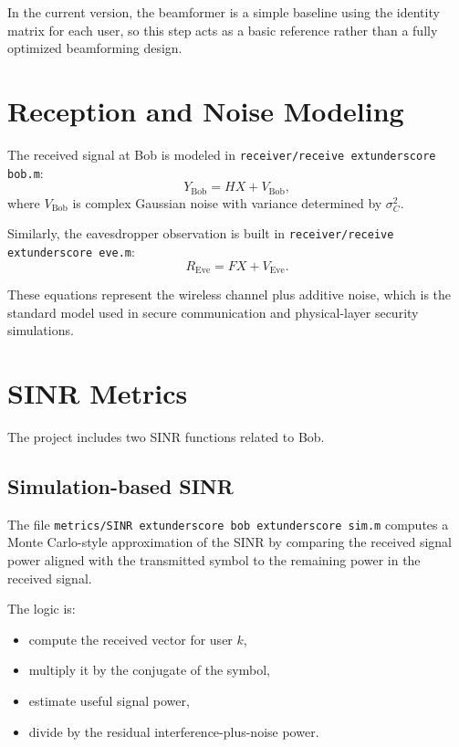 \documentclass[12pt]{article}
\begin{document}
In the current version, the beamformer is a simple baseline using the identity matrix for each user, so this step acts as a basic reference rather than a fully optimized beamforming design.

\section{Reception and Noise Modeling}
The received signal at Bob is modeled in \texttt{receiver/receive	extunderscore bob.m}:
\begin{equation}
Y_{\text{Bob}} = H X + V_{\text{Bob}},
\end{equation}
where $V_{\text{Bob}}$ is complex Gaussian noise with variance determined by $\sigma_C^2$.

Similarly, the eavesdropper observation is built in \texttt{receiver/receive	extunderscore eve.m}:
\begin{equation}
R_{\text{Eve}} = F X + V_{\text{Eve}}.
\end{equation}

These equations represent the wireless channel plus additive noise, which is the standard model used in secure communication and physical-layer security simulations.

\section{SINR Metrics}
The project includes two SINR functions related to Bob.

\subsection{Simulation-based SINR}
The file \texttt{metrics/SINR	extunderscore bob	extunderscore sim.m} computes a Monte Carlo-style approximation of the SINR by comparing the received signal power aligned with the transmitted symbol to the remaining power in the received signal.

The logic is:
\begin{itemize}[leftmargin=*]
    \item compute the received vector for user $k$,
    \item multiply it by the conjugate of the symbol,
    \item estimate useful signal power,
    \item divide by the residual interference-plus-noise power.
\end{itemize}
\end{document}
